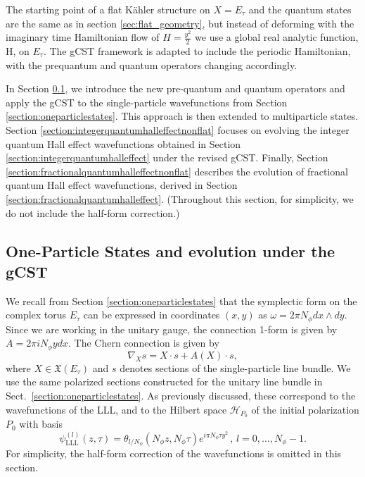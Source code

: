 \documentclass[a4paper,11pt]{article}
\begin{document}
The starting point of a flat K\"ahler
structure on $X=E_\tau$ and the quantum states are the same 
as in section \ref{sec:flat_geometry},
but instead of deforming 
with the imaginary time Hamiltonian flow
of $H=\frac{y^2}{2}$ we use a global  real analytic function, H, on $E_\tau$.
The gCST framework is adapted to include the periodic Hamiltonian, with the 
prequantum and quantum operators changing accordingly.

In Section \ref{section:oneparticlestatesnonflat}, we introduce the new pre-quantum and quantum operators and apply the gCST to the single-particle wavefunctions from Section \ref{section:oneparticlestates}. This approach is then extended to multiparticle states. Section \ref{section:integerquantumhalleffectnonflat} focuses on evolving the integer quantum Hall effect wavefunctions obtained in Section \ref{section:integerquantumhalleffect} under the revised gCST. Finally, Section \ref{section:fractionalquantumhalleffectnonflat} describes the evolution of fractional quantum Hall effect wavefunctions, derived in Section \ref{section:fractionalquantumhalleffect}. (Throughout this section, for simplicity, we do not include the half-form correction.)


\subsection{One-Particle States and evolution under the gCST}
\label{section:oneparticlestatesnonflat}
We recall from Section \ref{section:oneparticlestates} that the symplectic form on the complex torus $E_{\tau}$ can be expressed in coordinates $(x,y)$  as $\omega = 2\pi N_{\phi}dx\wedge dy$.  Since we are working in the unitary gauge, the connection 1-form is given by $A = 2\pi i N_{\phi}y dx$. The Chern connection is given by
\begin{equation}
\nabla_{X}s= X\cdot s+A(X)\cdot s,
\end{equation}
where $X\in \mathfrak{X}(E_{\tau})$ and $s$ denotes sections of the single-particle line bundle. We use the same polarized sections constructed for the unitary line bundle in Sect.~\ref{section:oneparticlestates}. As previously discussed, these correspond to the wavefunctions of the LLL, 
and to the Hilbert space $\mathcal{H}_{P_0}$ of the initial
polarization ${P}_0$
with basis
\begin{equation} 
\label{e-psilll}
\psi^{(l)}_{\mathrm{LLL}}(z,\tau) = \theta_{l/N_{\phi}}(N_{\phi}z, N_{\phi}\tau) e^{i\pi N_{\phi}\tau y^2} \,  , \, l=0, \dots , N_{\phi} -1 . 
\end{equation} 
For simplicity, the half-form correction of the wavefunctions is omitted in this section.
\end{document}
